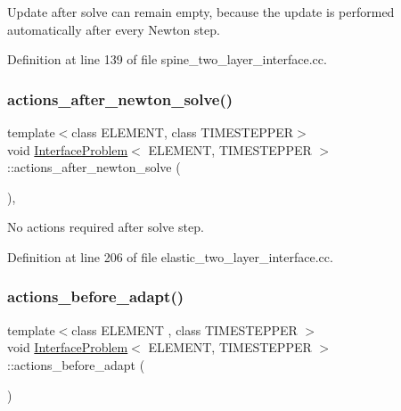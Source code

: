 Update after solve can remain empty, because the update is performed automatically after every Newton step. 



Definition at line 139 of file spine\+\_\+two\+\_\+layer\+\_\+interface.\+cc.

\mbox{\label{classInterfaceProblem_aedc2e58b3d2f5f8c898a21ba2d245cee}} 
\subsubsection{\texorpdfstring{actions\+\_\+after\+\_\+newton\+\_\+solve()}{actions\_after\_newton\_solve()}\hspace{0.1cm}{\footnotesize\ttfamily [2/2]}}
{\footnotesize\ttfamily template$<$class E\+L\+E\+M\+E\+NT, class T\+I\+M\+E\+S\+T\+E\+P\+P\+ER$>$ \\
void \hyperlink{classInterfaceProblem}{Interface\+Problem}$<$ E\+L\+E\+M\+E\+NT, T\+I\+M\+E\+S\+T\+E\+P\+P\+ER $>$\+::actions\+\_\+after\+\_\+newton\+\_\+solve (\begin{DoxyParamCaption}{ }\end{DoxyParamCaption})\hspace{0.3cm}{\ttfamily [inline]}, {\ttfamily [private]}}



No actions required after solve step. 



Definition at line 206 of file elastic\+\_\+two\+\_\+layer\+\_\+interface.\+cc.

\mbox{\label{classInterfaceProblem_a944e5754e9b3f3394211b6c62f705abe}} 
\subsubsection{\texorpdfstring{actions\+\_\+before\+\_\+adapt()}{actions\_before\_adapt()}}
{\footnotesize\ttfamily template$<$class E\+L\+E\+M\+E\+NT , class T\+I\+M\+E\+S\+T\+E\+P\+P\+ER $>$ \\
void \hyperlink{classInterfaceProblem}{Interface\+Problem}$<$ E\+L\+E\+M\+E\+NT, T\+I\+M\+E\+S\+T\+E\+P\+P\+ER $>$\+::actions\+\_\+before\+\_\+adapt (\begin{DoxyParamCaption}{ }\end{DoxyParamCaption})\hspace{0.3cm}{\ttfamily [private]}}



